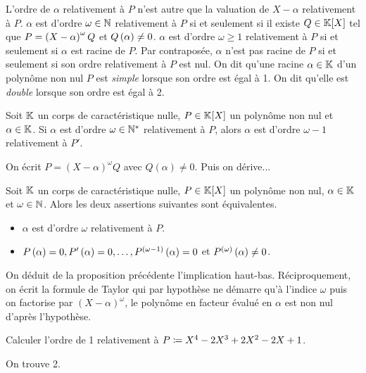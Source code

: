 \documentclass{magnolia}
\begin{document}
\begin{remarques}
\remarque L'ordre de $\alpha$ relativement à $P$ n'est autre que la valuation de $X-\alpha$ relativement à $P$.
\remarque $\alpha$ est d'ordre $\omega\in\mathbb{N}$ relativement à $P$ si
  et seulement si il existe $Q\in\polyK$ tel que $P=\left(X-\alpha\right)^\omega Q$ et
  $Q\left(\alpha\right)\neq 0$.
\remarque $\alpha$ est d'ordre $\omega\geq 1$ relativement à $P$ si et seulement si $\alpha$ est racine de $P$. Par contraposée, $\alpha$ n'est pas racine de $P$ si et seulement si son ordre relativement à $P$ est nul.
\remarque On dit qu'une racine $\alpha\in\mathbb{K}$ d'un polynôme non nul $P$ est
  \emph{simple} lorsque son ordre est égal
  à 1. On dit qu'elle est \emph{double} lorsque son ordre est égal à 2.
\end{remarques}

\begin{proposition}
Soit $\mathbb{K}$ un corps de caractéristique nulle, $P\in\polyK$ un polynôme non nul et $\alpha\in\mathbb{K}$. Si $\alpha$ est d'ordre $\omega\in{\mathbb{N}^*}$ relativement à $P$,
alors $\alpha$ est  d'ordre $\omega-1$ relativement à $P'$.
\end{proposition}

\begin{preuve}
On écrit $P=(X-\alpha)^\omega Q$ avec $Q(\alpha)\neq 0$. Puis on dérive...
\end{preuve}

\begin{proposition}
Soit $\mathbb{K}$ un corps de caractéristique nulle, $P\in\polyK$ un polynôme non nul,
$\alpha\in\mathbb{K}$ et $\omega\in\mathbb{N}$. Alors les
deux assertions suivantes sont équivalentes.
\begin{itemize}
\item $\alpha$ est d'ordre $\omega$ relativement à $P$.
\item $P\left(\alpha\right)=0,P'\left(\alpha\right)=0,\ldots,P^{(\omega-1)}\left(\alpha\right)=0$ et
  $P^{(\omega)}\left(\alpha\right)\neq 0$.
\end{itemize}
\end{proposition}

\begin{preuve}
On déduit de la proposition précédente l'implication haut-bas.
Réciproquement, on écrit la formule de Taylor qui par hypothèse ne démarre qu'à l'indice $\omega$ puis on factorise par $(X-\alpha)^\omega$, le polynôme en facteur évalué en $\alpha$ est non nul d'après l'hypothèse.
\end{preuve}

\begin{exoUnique}
\exo Calculer l'ordre de 1 relativement à $P\coloneqq X^4-2X^3+2X^2-2X+1$.
  \begin{sol}
  On trouve 2.
  \end{sol}  
\end{exoUnique}
\end{document}
